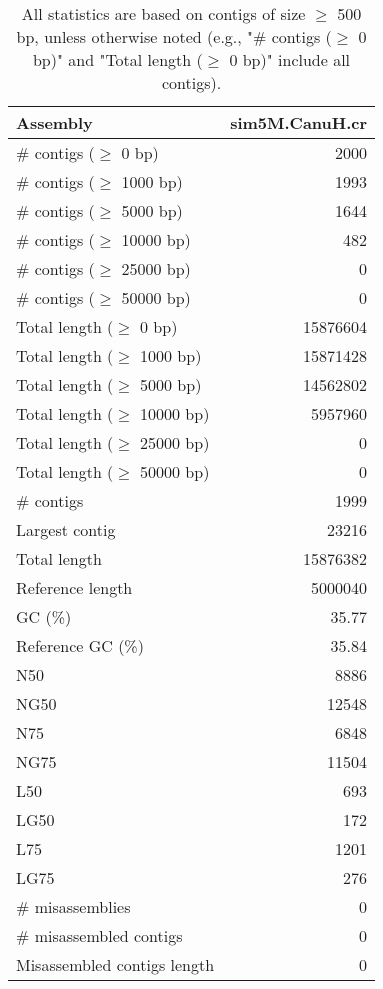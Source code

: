 \documentclass[12pt,a4paper]{article}
\begin{document}
\begin{table}[ht]
\begin{center}
\caption{All statistics are based on contigs of size $\geq$ 500 bp, unless otherwise noted (e.g., "\# contigs ($\geq$ 0 bp)" and "Total length ($\geq$ 0 bp)" include all contigs).}
\begin{tabular}{|l*{1}{|r}|}
\hline
Assembly & sim5M.CanuH.cr \\ \hline
\# contigs ($\geq$ 0 bp) & 2000 \\ \hline
\# contigs ($\geq$ 1000 bp) & 1993 \\ \hline
\# contigs ($\geq$ 5000 bp) & 1644 \\ \hline
\# contigs ($\geq$ 10000 bp) & 482 \\ \hline
\# contigs ($\geq$ 25000 bp) & 0 \\ \hline
\# contigs ($\geq$ 50000 bp) & 0 \\ \hline
Total length ($\geq$ 0 bp) & 15876604 \\ \hline
Total length ($\geq$ 1000 bp) & 15871428 \\ \hline
Total length ($\geq$ 5000 bp) & 14562802 \\ \hline
Total length ($\geq$ 10000 bp) & 5957960 \\ \hline
Total length ($\geq$ 25000 bp) & 0 \\ \hline
Total length ($\geq$ 50000 bp) & 0 \\ \hline
\# contigs & 1999 \\ \hline
Largest contig & 23216 \\ \hline
Total length & 15876382 \\ \hline
Reference length & 5000040 \\ \hline
GC (\%) & 35.77 \\ \hline
Reference GC (\%) & 35.84 \\ \hline
N50 & 8886 \\ \hline
NG50 & 12548 \\ \hline
N75 & 6848 \\ \hline
NG75 & 11504 \\ \hline
L50 & 693 \\ \hline
LG50 & 172 \\ \hline
L75 & 1201 \\ \hline
LG75 & 276 \\ \hline
\# misassemblies & 0 \\ \hline
\# misassembled contigs & 0 \\ \hline
Misassembled contigs length & 0 \\ \hline

\end{tabular}
\end{center}
\end{table}
\end{document}
